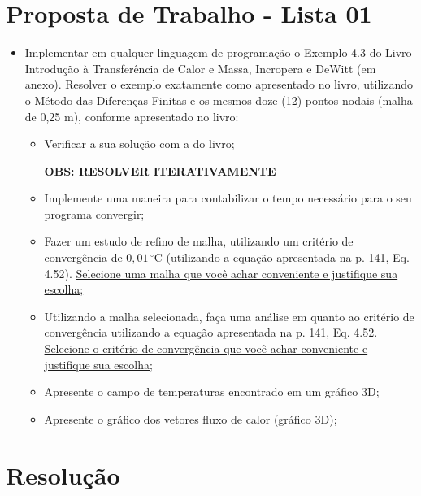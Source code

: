 \section*{Proposta de Trabalho - Lista 01}
\begin{itemize}
\item[1)]Implementar em qualquer linguagem de programação o Exemplo 4.3 do Livro Introdução à Transferência de Calor e Massa, Incropera e DeWitt (em anexo). Resolver o exemplo exatamente como apresentado no livro, utilizando o Método das Diferenças Finitas e os mesmos doze (12) pontos nodais (malha de 0,25 m), conforme apresentado no livro:
    \begin{itemize}
        \item[a)]Verificar a sua solução com a do livro;
        
        \textbf{OBS: RESOLVER ITERATIVAMENTE}

        \item[b)]Implemente uma maneira para contabilizar o tempo necessário para o seu programa convergir;
        \item[c)]Fazer um estudo de refino de malha, utilizando um critério de convergência de $0,01\,^\circ\mathrm{C}$ (utilizando a equação apresentada na p. 141, Eq. 4.52). \uline{Selecione uma malha que você achar conveniente e justifique sua escolha;}
        \item[d)]Utilizando a malha selecionada, faça uma análise em quanto ao critério de convergência utilizando a equação apresentada na p. 141, Eq. 4.52. \uline{Selecione o critério de convergência que você achar conveniente e justifique sua escolha;}
        \item[e)]Apresente o campo de temperaturas encontrado em um gráfico 3D;
        \item[f)]Apresente o gráfico dos vetores fluxo de calor (gráfico 3D);
    \end{itemize}
\end{itemize}
\section*{Resolução}

